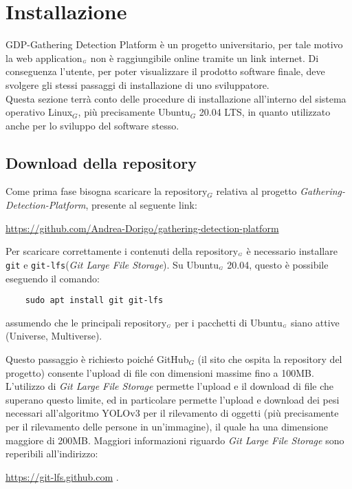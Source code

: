 \section{Installazione}\label{RequisitiDiSistemaEdInstallazioneInstallazione}

 GDP-Gathering Detection Platform è un progetto universitario, per tale motivo la web application$_{\scaleto{G}{3pt}}$ non è raggiungibile online tramite un link internet. Di conseguenza l'utente, per poter visualizzare il prodotto software finale, deve svolgere gli stessi passaggi di installazione di uno sviluppatore.\\
Questa sezione terrà conto delle procedure di installazione all'interno del sistema operativo Linux$_G$, più precisamente Ubuntu$_G$ 20.04 LTS, in quanto utilizzato anche per lo sviluppo del software stesso.

\subsection{Download della  repository}\label{RequisitiDiSistemaEdInstallazioneInstallazioneDownloadRepo}
Come prima fase bisogna scaricare la repository$_G$ relativa al progetto \textit{Gathering-Detection-Platform}, presente al seguente link:
\begin{center} \url{https://github.com/Andrea-Dorigo/gathering-detection-platform}
\end{center}

Per scaricare correttamente i contenuti della repository$_{\scaleto{G}{3pt}}$ è necessario installare \texttt{git} e \texttt{git-lfs}(\textit{Git Large File Storage}).
Su Ubuntu$_{\scaleto{G}{3pt}}$ 20.04, questo è possibile eseguendo il comando:
\begin{lstlisting}
	sudo apt install git git-lfs
\end{lstlisting}
assumendo che le principali repository$_{\scaleto{G}{3pt}}$ per i pacchetti di Ubuntu$_{\scaleto{G}{3pt}}$ siano attive (Universe, Multiverse).

Questo passaggio è richiesto poiché GitHub$_G$ (il sito che ospita la repository del progetto) consente l'upload di file con dimensioni massime fino a 100MB.
L'utilizzo di \textit{Git Large File Storage} permette l'upload e il download di file che superano questo limite, ed in particolare permette l'upload e download dei pesi necessari all'algoritmo YOLOv3 per il rilevamento di oggetti (più precisamente per il rilevamento delle persone in un'immagine), il quale ha una dimensione maggiore di 200MB. Maggiori informazioni riguardo \textit{Git Large File Storage} sono reperibili all'indirizzo:
\begin{center}
	 \url{https://git-lfs.github.com} .
\end{center}

